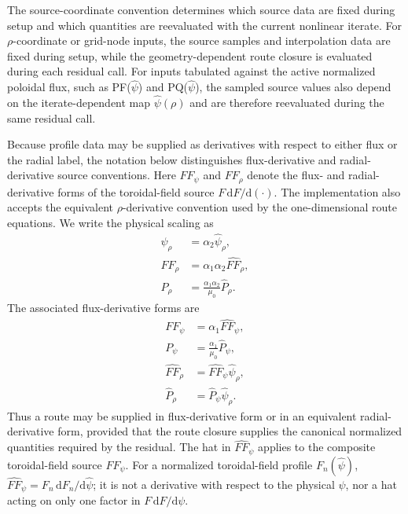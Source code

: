 \documentclass[final, 3p, times]{elsarticle}
\begin{document}
The source-coordinate convention determines which source data are fixed during setup and which quantities are reevaluated with the current nonlinear iterate. For $\rho$-coordinate or grid-node inputs, the source samples and interpolation data are fixed during setup, while the geometry-dependent route closure is evaluated during each residual call. For inputs tabulated against the active normalized poloidal flux, such as PF($\hat{\psi}$) and PQ($\hat{\psi}$), the sampled source values also depend on the iterate-dependent map $\hat{\psi}(\rho)$ and are therefore reevaluated during the same residual call.

Because profile data may be supplied as derivatives with respect to either flux or the radial label, the notation below distinguishes flux-derivative and radial-derivative source conventions. Here $FF_\psi$ and $FF_\rho$ denote the flux- and radial-derivative forms of the toroidal-field source $F\,\mathrm{d}F/\mathrm{d}(\cdot)$. The implementation also accepts the equivalent $\rho$-derivative convention used by the one-dimensional route equations. We write the physical scaling as
\begin{align}
    \psi_\rho
     & =\alpha_2\hat{\psi}_\rho,                     \\
    FF_\rho
     & =\alpha_1\alpha_2\hat{FF}_\rho,               \\
    P_\rho
     & =\frac{\alpha_1\alpha_2}{\mu_0}\hat{P}_\rho .
\end{align}
The associated flux-derivative forms are
\begin{align}
    FF_\psi
     & =\alpha_1\hat{FF}_\psi,              \\
    P_\psi
     & =\frac{\alpha_1}{\mu_0}\hat{P}_\psi, \\
    \hat{FF}_\rho
     & =\hat{FF}_\psi\hat{\psi}_\rho,       \\
    \hat{P}_\rho
     & =\hat{P}_\psi\hat{\psi}_\rho .
\end{align}
Thus a route may be supplied in flux-derivative form or in an equivalent radial-derivative form, provided that the route closure supplies the canonical normalized quantities required by the residual. The hat in $\hat{FF}_\psi$ applies to the composite toroidal-field source $FF_\psi$. For a normalized toroidal-field profile $F_n(\hat{\psi})$, $\hat{FF}_\psi=F_n\,\mathrm{d}F_n/\mathrm{d}\hat{\psi}$; it is not a derivative with respect to the physical $\psi$, nor a hat acting on only one factor in $F\,\mathrm{d}F/\mathrm{d}\psi$.
\end{document}
